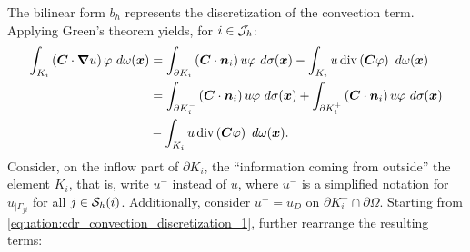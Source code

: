 The bilinear form $b_h$ represents the discretization of the convection term. Applying Green's theorem yields, for $i \in \mathcal{J}_h$:
\begin{align}
    \int_{K_i} \left( \bm{C} \cdot \bm{\nabla} u \right) \varphi ~ d \omega(\bm{x}) &= \int_{\partial K_i} \left( \bm{C} \cdot \bm{n}_i \right) u \varphi ~ d \sigma(\bm{x}) - \int_{K_i} u \operatorname*{div} \left( \bm{C} \varphi \right) ~ d \omega(\bm{x}) \notag \\
    &= \int_{\partial K_i^-} \left( \bm{C} \cdot \bm{n}_i \right) u \varphi ~ d \sigma(\bm{x}) + \int_{\partial K_i^+} \left( \bm{C} \cdot \bm{n}_i \right) u \varphi ~ d \sigma(\bm{x}) \label{equation:cdr_convection_discretization_1} \\
    & - \int_{K_i} u \operatorname*{div} \left( \bm{C} \varphi \right) ~ d \omega(\bm{x}). \notag
\end{align}
Consider, on the inflow part of $\partial K_i$, the ``information coming from outside'' the element $K_i$, that is, write $u^-$ instead of $u$, where $u^-$ is a simplified notation for $u_{\mid \Gamma_{ji}}$ for all $j \in \mathcal{S}_h(i)$. Additionally, consider $u^- = u_D$ on $\partial K_i^- \cap \partial \Omega$. Starting from \cref{equation:cdr_convection_discretization_1}, further rearrange the resulting terms:
